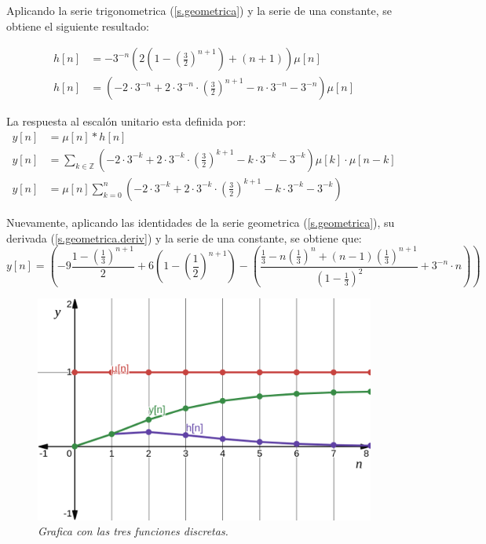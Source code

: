 \documentclass[a4paper,12pt]{report}
\begin{document}
\begin{enumerate}[label=\alph*), left=0pt]
    Aplicando la serie trigonometrica (\ref{s.geometrica}) y la serie de una constante, se obtiene el siguiente
    resultado:

    \begin{align*}
      h[n] &= -3^{-n} \left(2\left(1 - \left(\frac{3}{2}\right)^{n+1} \right) + (n+1)\right) \mu[n]\\[6pt]
      h[n] &= \left(-2 \cdot 3^{-n} + 2 \cdot 3^{-n} \cdot \left(\frac{3}{2}\right)^{n+1} -
        n \cdot 3^{-n} - 3^{-n}\right)\mu[n]
    \end{align*}

    La respuesta al escalón unitario esta definida por:
    \begin{align*}
      y[n] &= \mu[n] * h[n]\\[6pt]
      y[n] &= \sum_{k \in \mathbb{Z}} \left(-2 \cdot 3^{-k} + 2 \cdot 3^{-k} \cdot \left(\frac{3}{2}\right)^{k+1} -
        k \cdot 3^{-k} - 3^{-k}\right)\mu[k] \cdot \mu[n-k]\\[6pt]
      y[n] &= \mu[n] \sum_{k=0}^n \left(-2 \cdot 3^{-k} + 2 \cdot 3^{-k} \cdot \left(\frac{3}{2}\right)^{k+1} -
        k \cdot 3^{-k} - 3^{-k}\right)
    \end{align*}

    Nuevamente, aplicando las identidades de la serie geometrica (\ref{s.geometrica}), su derivada (\ref{s.geometrica.deriv})
    y la serie de una constante, se obtiene que:
    \begin{equation*}
      y[n] = \left(-9 \frac{1-\left(\frac{1}{3}\right)^{n+1}}{2} + 6 \left(1 - \left(\frac{1}{2}\right)^{n+1}\right) -
        \left(\frac{\frac{1}{3} - n\left(\frac{1}{3}\right)^{n} + (n-1) \left(\frac{1}{3}\right)^{n+1}}{\left(1-\frac{1}{3}\right)^{2}}+3^{-n}\cdot n\right)\right)
    \end{equation*}

    \begin{figure}[H]
      \centering
      \begin{minipage}{0.55\textwidth}
        \centering
        \includegraphics[width=1\textwidth]{./images/ej2.2.png}
        \textit{Grafica con las tres funciones discretas.}
      \end{minipage}
    \end{figure}

\end{enumerate}
\end{document}
